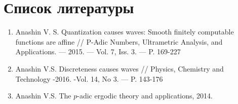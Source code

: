 \nocite{*}


\chapter*{Список литературы}

\noindent
\begin{enumerate}
  \item Anashin V. S. Quantization causes waves: Smooth finitely computable
functions are affine // P-Adic Numbers, Ultrametric Analysis, and
Applications. — 2015. — Vol. 7, Iss. 3. — P. 169-227

  \item Anashin V.S. Discreteness causes waves // Physics, Chemistry and Technology -2016. -Vol. 14, No 3. — P. 143-176

  \item Anashin V.S. The $p$-adic ergodic theory and applications, 2014.
\end{enumerate}